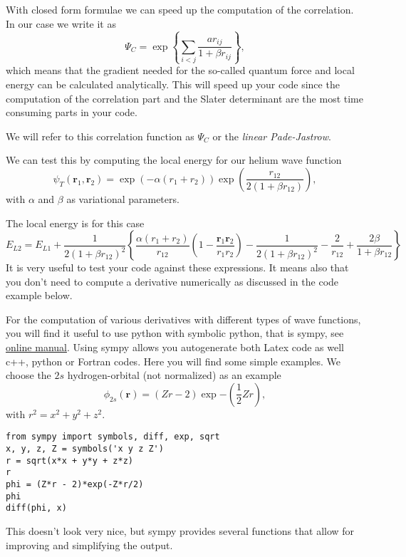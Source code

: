 With closed form formulae we  can speed up the computation of the correlation. In our case
we write it as 
\[
\Psi_C= \exp{\left\{\sum_{i < j}\frac{ar_{ij}}{1+\beta r_{ij}}\right\}},
\]
which means that the gradient needed for the so-called quantum force and local energy 
can be calculated analytically.
This will speed up your code since the computation of the correlation part and the Slater determinant are the most 
time consuming parts in your code.  

We will refer to this correlation function as $\Psi_C$ or the \emph{linear Pade-Jastrow}.

We can test this by computing the local energy for our helium wave function
\[
   \psi_{T}(\bm{r}_1,\bm{r}_2) = 
   \exp{\left(-\alpha(r_1+r_2)\right)}
   \exp{\left(\frac{r_{12}}{2(1+\beta r_{12})}\right)}, 
\]
with $\alpha$ and $\beta$ as variational parameters.

The local energy is for this case 
\[ 
E_{L2} = E_{L1}+\frac{1}{2(1+\beta r_{12})^2}\left\{\frac{\alpha(r_1+r_2)}{r_{12}}(1-\frac{\bm{r}_1\bm{r}_2}{r_1r_2})-\frac{1}{2(1+\beta r_{12})^2}-\frac{2}{r_{12}}+\frac{2\beta}{1+\beta r_{12}}\right\}
\]
It is very useful to test your code against these expressions. It means also that you don't need to
compute a derivative numerically as discussed in the code example below. 

For the computation of various derivatives with different types of wave functions, you will find it useful to use python with symbolic python, that is sympy, see \href{{http://docs.sympy.org/latest/index.html}}{online manual}.  Using sympy allows you autogenerate both Latex code as well c++, python or Fortran codes. Here you will find some simple examples. We choose 
the $2s$ hydrogen-orbital  (not normalized) as an example
\[
 \phi_{2s}(\bm{r}) = (Zr - 2)\exp{-(\frac{1}{2}Zr)},
\]
with $ r^2 = x^2 + y^2 + z^2$.









\begin{verbatim}
from sympy import symbols, diff, exp, sqrt
x, y, z, Z = symbols('x y z Z')
r = sqrt(x*x + y*y + z*z)
r
phi = (Z*r - 2)*exp(-Z*r/2)
phi
diff(phi, x)

\end{verbatim}

This doesn't look very nice, but sympy provides several functions that allow for improving and simplifying the output.

